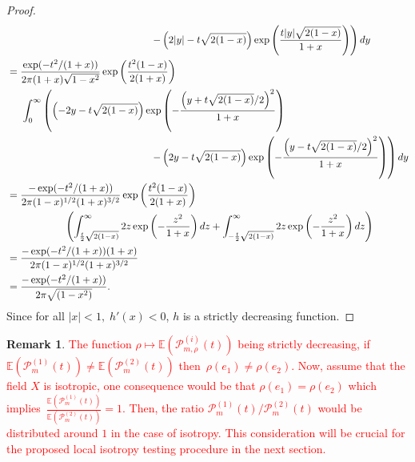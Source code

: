 \documentclass[12pt]{article}
\theoremstyle{Theorem}
\theoremstyle{definition}
\newtheorem{remark}{Remark}
\begin{document}
\begin{proof}
\begin{align*}
&\hspace{5cm}\left. - \left(2|y| - t\sqrt{2(1-x)}\right)\exp\left(\frac{t|y|\sqrt{2(1-x)}}{1+x}\right)\right)dy \\ 
& = \frac{\exp(-t^2/(1+x))}{2\pi(1+x)\sqrt{1-x^2}}\exp\left(\frac{t^2(1-x)}{2(1+x)}\right)\\
&\hspace{0.5cm} \int_{0}^{\infty}\left(\left(-2y -t\sqrt{2(1-x)}\right)\exp\left(-\frac{\left(y+t\sqrt{2(1-x)}/2\right)^{2}}{1+x}\right)\right. \\
&\hspace{5cm}\left. - \left(2y - t\sqrt{2(1-x)}\right)\exp\left(-\frac{\left(y-t\sqrt{2(1-x)}/2\right)^{2}}{1+x}\right)\right)dy \\
& = \frac{-\exp(-t^2/(1+x))}{2\pi(1-x)^{1/2}(1+x)^{3/2}}\exp\left(\frac{t^2(1-x)}{2(1+x)}\right)\\
& \hspace{2cm} \left(\int_{\frac{t}{2}\sqrt{2(1-x)}}^{\infty}2z\exp\left(-\frac{z^2}{1+x}\right)dz + \int_{-\frac{t}{2}\sqrt{2(1-x)}}^{\infty}2z\exp\left(-\frac{z^2}{1+x}\right)dz \right)\\
& = \frac{-\exp(-t^2/(1+x))(1+x)}{2\pi(1-x)^{1/2}(1+x)^{3/2}}\\
& = \frac{-\exp(-t^2/(1+x))}{2\pi\sqrt{(1-x^2)}}.
\end{align*}
Since for all $|x| < 1, \; h'(x) < 0$, $h$ is a strictly decreasing function. 
\end{proof}
\begin{remark}
\label{remarkesperancetest}
\textcolor{red}{The function $\rho \mapsto \mathbb{E}\left(\mathcal{P}^{\scriptscriptstyle (i)}_{m, \rho}(t)\right)$ being strictly decreasing, if $\mathbb{E}\left(\mathcal{P}^{\scriptscriptstyle (1)}_{m}(t)\right) \neq \mathbb{E}\left(\mathcal{P}^{\scriptscriptstyle (2)}_{m}(t)\right)$ then~$\rho(e_1) \neq \rho(e_2) $. Now, assume that the field $X$ is isotropic, one consequence would be that $\rho(e_{1}) = \rho(e_{2})$ which implies~$\frac{\mathbb{E}\left(\mathcal{P}^{\scriptscriptstyle (1)}_{m}(t)\right)}{\mathbb{E}\left(\mathcal{P}^{\scriptscriptstyle (2)}_{m}(t)\right)} = 1$. Then, the ratio $\mathcal{P}^{\scriptscriptstyle  (1)}_{m}(t)/\mathcal{P}^{\scriptscriptstyle  (2)}_{m}(t)$ would be distributed around $1$ in the case of isotropy. This consideration will be crucial for the proposed local isotropy testing procedure in the next section.}
\end{remark}
\end{document}
